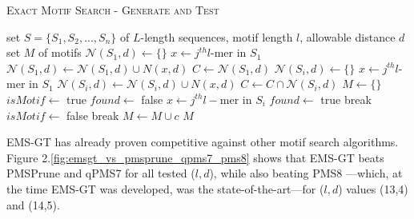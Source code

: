 \documentclass[oneside,12pt]{DISCSthesis}
\begin{document}
		{ %
			\noindent\hspace*{6pt}{\bf Algorithm 2.1} \textsc{Exact Motif Search - Generate and Test}\small
			\begin{algorithmic}[1] \label{alg:EMS-GT}
			\Require set $S = \{S_{1},S_{2},...,S_{n}\}$ of $L$-length sequences, \newline \hspace*{25pt}motif length $l$, allowable distance $d$
			\Ensure set $M$ of motifs \vspace*{6pt}
			\State $\mathcal{N}(S_{1},d) \leftarrow \{\}$
										\hspace*{200pt}
				\State $x \leftarrow j^{th} l$-mer in $S_{1}$			
				\State $\mathcal{N}(S_{1},d) \leftarrow \mathcal{N}(S_{1},d) \cup N(x,d)$
			\EndFor
			\State $C \leftarrow \mathcal{N}(S_{1},d)$
				\State $\mathcal{N}(S_{i}, d) \leftarrow \{\}$
					\State $x \leftarrow j^{th} l$-mer in $S_{1}$
					\State $\mathcal{N}(S_{i},d) \leftarrow \mathcal{N}(S_{i},d) \cup N(x,d)$
				\EndFor
				\State $C \leftarrow C \cap \mathcal{N}(S_{i},d)$
			\EndFor
			\State $M \leftarrow \{\}$										
											\hspace*{190pt}
				\State $isMotif \leftarrow$ true
					\State $found \leftarrow$ false
						\State $x \leftarrow j^{th} l-$mer in $S_{i}$
							\State $found \leftarrow$ true
							\State break
						\EndIf
					\EndFor
					\If{!$found$}
						\State $isMotif \leftarrow$ false
						\State break
					\EndIf
				\EndFor
				\If{$isMotif$}
					\State $M \leftarrow M \cup c$
				\EndIf
			\EndFor
			\State\Return $M$
			\end{algorithmic}
			}\normalsize{}\newpage

		EMS-GT has already proven competitive against other motif search algorithms. Figure 2.\ref{fig:emsgt_vs_pmsprune_qpms7_pms8} shows that EMS-GT beats PMSPrune \cite{pms2007} and qPMS7 \cite{pms2007} for all tested ($l,d$), while also beating PMS8 \cite{pms2014}---which, at the time EMS-GT was developed, was the state-of-the-art---for ($l,d$) values (13,4) and (14,5).
\end{document}
